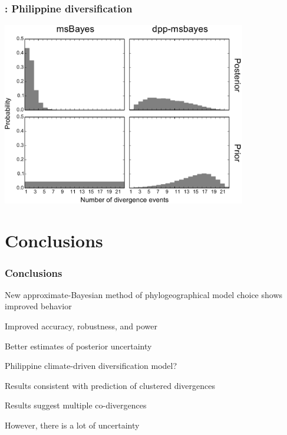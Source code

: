 \begin{frame}
    \frametitle{\dppmsbayes: Philippine diversification}
    \centerline{
    \includegraphics[width=0.8\textwidth]{../../empirical-analyses/plots/philippines-dpp-psi-posterior-old-vs-dpp-with-prior.pdf}}
\end{frame}


\section{Conclusions}

\begin{frame}
    \frametitle{Conclusions}
    \begin{myitemize}
        \item<1-> New approximate-Bayesian method of phylogeographical
            model choice shows improved behavior
            \begin{myitemize}
                \item<1-> Improved accuracy, robustness, and power
                \item<1-> Better estimates of posterior
                    uncertainty
            \end{myitemize}
        \smallskip
        \item<2-> Philippine climate-driven diversification model?
            \begin{myitemize}
                \item<2-> Results consistent with prediction of clustered
                    divergences
                \item<2-> Results suggest multiple co-divergences
                \item<2-> However, there is a lot of uncertainty
            \end{myitemize}
    \end{myitemize}
\end{frame}

